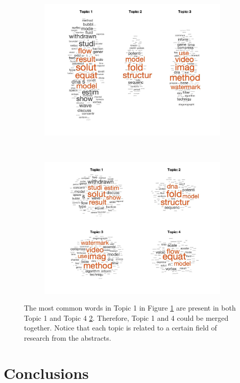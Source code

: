 \documentclass[12pt]{article}
\begin{document}
\begin{figure}[h]
	\centering
	\begin{subfigure}{0.4\textwidth}
		\includegraphics[width=\textwidth]{images/MAP/wordcloud_MAP3_topics.jpg}
		\caption{}
		\label{fig:cloud_3}
	\end{subfigure}
	~	
	\begin{subfigure}{0.4\textwidth}
		\includegraphics[width=\textwidth]{images/MAP/wordcloud_MAP4_topics.jpg}
		\caption{}
		\label{fig:cloud_4}
	\end{subfigure}
	\caption{The most common words in Topic 1 in Figure \ref{fig:cloud_3} are present in both Topic 1 and Topic 4 \ref{fig:cloud_4}. Therefore, Topic 1 and 4 could be merged together. Notice that each topic is related to a certain field of research from the abstracts.}
	\label{fig:clouds}
\end{figure}


\section{Conclusions}



\clearpage
\nocite{*}
\printbibliography
\end{document}
